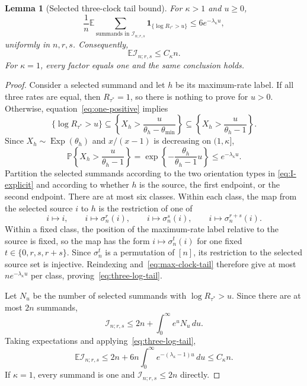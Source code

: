 \documentclass[11pt]{article}
\newtheorem{lemma}[theorem]{Lemma}
\theoremstyle{remark}
\newcommand{\Pp}{\mathbb P}
\newcommand{\Ee}{\mathbb E}
\newcommand{\one}{\mathbf 1}
\newcommand{\dd}{\,d}
\newcommand{\Exp}{\operatorname{Exp}}
\begin{document}
\begin{lemma}[Selected three-clock tail bound]\label{lem:three-tail}
For $\kappa>1$ and $u\geq0$,
\begin{equation}\label{eq:three-log-tail}
 \frac1n\Ee\sum_{\text{summands in }\mathcal I_{n;r,s}}
 \one_{\{\log R_{\tau^*}>u\}}
 \leq6e^{-\lambda_\kappa u},
\end{equation}
uniformly in $n,r,s$.  Consequently,
\begin{equation}\label{eq:three-first}
 \Ee\mathcal I_{n;r,s}\leq C_\kappa n.
\end{equation}
For $\kappa=1$, every factor equals one and the same conclusion holds.
\end{lemma}

\begin{proof}
Consider a selected summand and let $h$ be its maximum-rate label.  If all
three rates are equal, then $R_{\tau^*}=1$, so there is nothing to prove for
$u>0$.  Otherwise, equation~\eqref{eq:one-positive} implies
\[
 \{\log R_{\tau^*}>u\}
 \subseteq
 \left\{X_h>\frac{u}{\theta_h-\theta_{\min}}\right\}
 \subseteq
 \left\{X_h>\frac{u}{\theta_h-1}\right\}.
\]
Since $X_h\sim\Exp(\theta_h)$ and
$x/(x-1)$ is decreasing on $(1,\kappa]$,
\begin{equation}\label{eq:max-clock-tail}
 \Pp\left\{X_h>\frac{u}{\theta_h-1}\right\}
 =\exp\left\{-\frac{\theta_h}{\theta_h-1}u\right\}
 \leq e^{-\lambda_\kappa u}.
\end{equation}
Partition the selected summands according to the two orientation types in
\eqref{eq:I-explicit} and according to whether $h$ is the source, the first
endpoint, or the second endpoint.  There are at most six classes.  Within
each class, the map from the selected source $i$ to $h$ is the restriction
of one of
\[
 i\mapsto i,\qquad i\mapsto\sigma_n^r(i),\qquad
 i\mapsto\sigma_n^s(i),\qquad i\mapsto\sigma_n^{r+s}(i).
\]
Within a fixed class, the position of the maximum-rate label relative to
the source is fixed, so the map has the form $i\mapsto\sigma_n^t(i)$ for
one fixed $t\in\{0,r,s,r+s\}$.  Since $\sigma_n^t$ is a permutation of
$[n]$, its restriction to the selected source set is injective.  Reindexing
and~\eqref{eq:max-clock-tail} therefore give at most
$ne^{-\lambda_\kappa u}$ per class, proving~\eqref{eq:three-log-tail}.

Let $N_u$ be the number of selected summands with
$\log R_{\tau^*}>u$.  Since there are at most $2n$ summands,
\[
 \mathcal I_{n;r,s}
 \leq2n+\int_0^\infty e^uN_u\dd u.
\]
Taking expectations and applying~\eqref{eq:three-log-tail},
\[
 \Ee\mathcal I_{n;r,s}
 \leq2n+6n\int_0^\infty e^{-(\lambda_\kappa-1)u}\dd u
 \leq C_\kappa n.
\]
If $\kappa=1$, every summand is one and
$\mathcal I_{n;r,s}\leq2n$ directly.
\end{proof}
\end{document}
